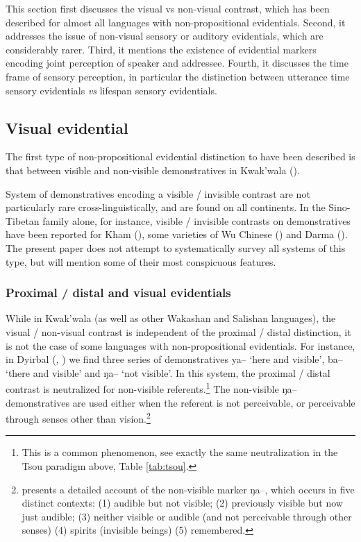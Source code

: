 \documentclass[oneside,a4paper,11pt]{article}
\newcommand{\ipa}[1]{{\phon \mbox{#1}}} %
\begin{document}
This section first discusses the visual vs non-visual contrast, which has been described for almost all languages with non-propositional evidentials. Second, it addresses the issue of non-visual sensory or auditory evidentials, which are considerably rarer.  Third, it mentions the existence of evidential markers encoding joint perception of speaker and addressee. Fourth, it discusses the time frame of sensory perception, in particular the distinction between utterance time sensory evidentials \textit{vs} lifespan sensory evidentials.

\subsection{Visual evidential} \label{sec:visible}
The first type of non-propositional evidential distinction to have been described  is that between visible and non-visible demonstratives in Kwak'wala (\citealt[527-531]{boas11kwakiutl}). 

System of demonstratives encoding a visible / invisible contrast are not particularly rare cross-linguistically, and are found on all continents. In the Sino-Tibetan family alone, for instance, visible / invisible contrasts on demonstratives have been reported for Kham (\citealt{watters02grammar}), some varieties of Wu Chinese (\citealt[89]{yue03dialects}) and Darma (\citealt{willis15deictic}). The present paper does not attempt to systematically survey all systems of this type, but will mention some of their most conspicuous features.

 
\subsubsection{Proximal / distal and visual evidentials} \label{sec:proximal}
While in Kwak'wala (as well as other Wakashan and Salishan languages), the visual / non-visual contrast is independent of the proximal / distal distinction, it is not the case of some languages with non-propositional evidentials. For instance, in Dyirbal (\citealt[45]{dixon72dyirbal}, \citealt{dixon14nonvisible}) we find three series of demonstratives \ipa{ya--} `here and visible', \ipa{ba--} `there and visible' and \ipa{ŋa--} `not visible'. In this system, the proximal / distal contrast is neutralized for non-visible referents.\footnote{This is a common phenomenon, see exactly the same neutralization in the Tsou paradigm above, Table \ref{tab:tsou}.} The non-visible \ipa{ŋa--} demonstratives are used either when the referent is not perceivable, or perceivable through senses other than vision.\footnote{\citet{dixon14nonvisible} presents a detailed account of the non-visible marker  \ipa{ŋa--}, which occurs in five distinct contexts: (1) audible but not visible; (2) previously visible but now just audible; (3) neither visible or audible (and not perceivable through other senses) (4) spirits (invisible beings) (5) remembered.  } 
\end{document}
